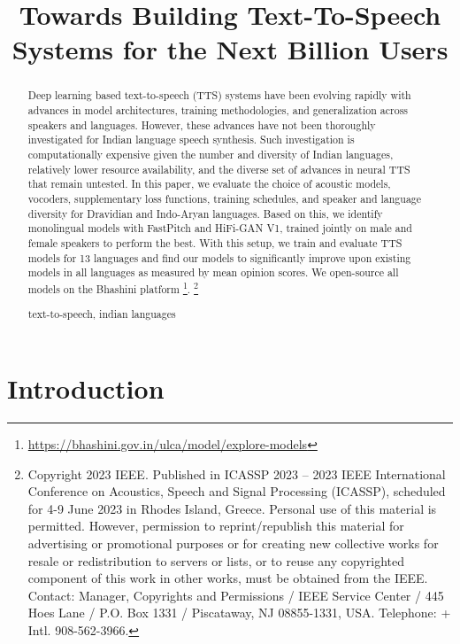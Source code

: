 \documentclass{article}
\title{Towards Building Text-To-Speech Systems for the Next Billion Users}
\newcommand\blfootnote[1]{\begingroup
  \renewcommand\thefootnote{}\footnote{#1}\addtocounter{footnote}{-1}\endgroup
}
\begin{document}
\ninept
\maketitle

\begin{abstract}
Deep learning based text-to-speech (TTS) systems have been evolving rapidly with advances in model architectures, training methodologies, and generalization across speakers and languages.
However, these advances have not been thoroughly investigated for Indian language speech synthesis.
Such investigation is computationally expensive given the number and diversity of Indian languages, relatively lower resource availability, and the diverse set of advances in neural TTS that remain untested. 
In this paper, we evaluate the choice of acoustic models, vocoders, supplementary loss functions, training schedules, and speaker and language diversity for Dravidian and Indo-Aryan languages.
Based on this, we identify monolingual models with FastPitch and HiFi-GAN V1, trained jointly on male and female speakers to perform the best.
With this setup, we train and evaluate TTS models for 13 languages and find our models to significantly improve upon existing models in all languages as measured by mean opinion scores.
We open-source all models on the Bhashini platform \footnote{\scriptsize \url{https://bhashini.gov.in/ulca/model/explore-models}}.
\blfootnote{Copyright 2023 IEEE. Published in ICASSP 2023 – 2023 IEEE International Conference on Acoustics, Speech and Signal Processing (ICASSP), scheduled for 4-9 June 2023 in Rhodes Island, Greece. Personal use of this material is permitted. However, permission to reprint/republish this material for advertising or promotional purposes or for creating new collective works for resale or redistribution to servers or lists, or to reuse any copyrighted component of this work in other works, must be obtained from the IEEE. Contact: Manager, Copyrights and Permissions / IEEE Service Center / 445 Hoes Lane / P.O. Box 1331 / Piscataway, NJ 08855-1331, USA. Telephone: + Intl. 908-562-3966.}

\begin{keywords}
text-to-speech, indian languages
\end{keywords}

\end{abstract}


\section{Introduction}
\label{sec:intro}
\end{document}
